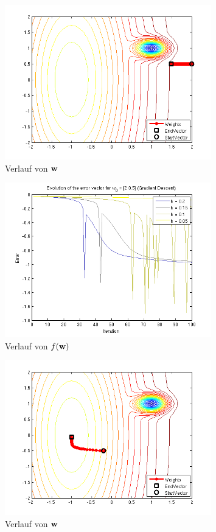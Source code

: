\begin{figure}[h!]
  \centering
  \includegraphics[width=0.8\textwidth]{./figures/211/path_w01_eta005.png}
  \caption{Verlauf von $\mathbf{w}$}
  \label{fig:path_w01_eta005}
\end{figure}

\begin{figure}[h!]
  \centering
  \includegraphics[width=0.8\textwidth]{./figures/211/error_w01.png}
  \caption{Verlauf von $f(\mathbf{w})$}
  \label{fig:error_w01}
\end{figure}

\begin{figure}[h!]
  \centering
  \includegraphics[width=0.8\textwidth]{./figures/211/path_w02_eta02.png}
  \caption{Verlauf von $\mathbf{w}$}
  \label{fig:path_w02_eta02}
\end{figure}

